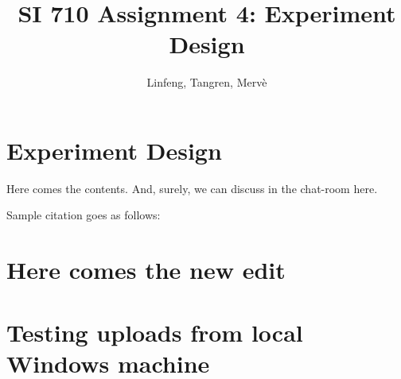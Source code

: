 \documentclass{article}
\title{SI 710 Assignment 4: Experiment Design}
\author{Linfeng, Tangren, Merv\`e}
\date{}
\begin{document}
\maketitle

\section{Experiment Design}

Here comes the contents. And, surely, we can discuss in the chat-room here.

Sample citation goes as follows: \cite{adams1995hitchhiker}


\section{Here comes the new edit}

\section{Testing uploads from local Windows machine}



\end{document}
